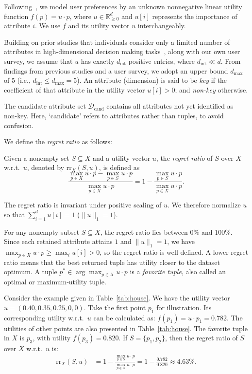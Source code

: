 Following~\cite{CB00, LC09, NL12, NS10, PW14}, we model user preferences by an unknown nonnegative linear utility function $f(p)=u\cdot p$, where $u\in\mathbb{R}_{\geq0}^{d}$ and $u[i]$ represents the importance of attribute $i$. We use $f$ and its utility vector $u$ interchangeably.

Building on prior studies that individuals consider only a limited number of attributes in high-dimensional decision making tasks~\cite{GG96, GA12, WX22, SC05, TK03, DMW12}, along with our own user survey, we assume that $u$ has exactly $d_\text{int}$ positive entries, where $d_\text{int}\ll d$. From findings from previous studies and a user survey, we adopt an upper bound $d_\text{max}$ of $5$ (i.e., $d_\text{int}\leq d_\text{max}=5$). An attribute (dimension) is said to be \textit{key} if the coefficient of that attribute in the utility vector $u[i]>0$; and \textit{non-key} otherwise.

The candidate attribute set $\mathcal{D}_\text{cand}$ contains all attributes not yet identified as non-key. Here, `candidate' refers to attributes rather than tuples, to avoid confusion.

We define the \textit{regret ratio}\cite{NS10} as follows:

\begin{definition}\cite{NS10}
Given a nonempty set $S \subseteq X$ and a utility vector $u$, the \emph{regret ratio} of $S$ over $X$ w.r.t.\ $u$, denoted by $\mathrm{rr}_X(S, u)$, is defined as
\[
\frac{\max_{p \in X} u \cdot p - \max_{p \in S} u \cdot p}{\max_{p \in X} u \cdot p}
= 1 - \frac{\max_{p \in S} u \cdot p}{\max_{p \in X} u \cdot p}.
\]
\end{definition}

The regret ratio is invariant under positive scaling of $u$. We therefore normalize $u$ so that $\sum_{i=1}^{d}u[i]=1$ ($\lVert u\rVert_1=1$).

For any nonempty subset $S\subseteq X$, the regret ratio lies between $0\%$ and $100\%$. Since each retained attribute attains $1$ and $\lVert u\rVert_1=1$, we have $\max_{p\in X}u\cdot p\geq\max_i u[i]>0$, so the regret ratio is well defined. A lower regret ratio means that the best returned tuple has utility closer to the dataset optimum. A tuple $p^*\in\arg\max_{p\in X}u\cdot p$ is a \textit{favorite tuple}, also called an optimal or maximum-utility tuple.

Consider the example given in Table~\ref{tab:house}. We have the utility vector $u = (0.40, 0.35, 0.25, 0, 0)$. Take the first point $p_1$ for illustration. Its corresponding utility w.r.t.\ $u$ can be calculated as: $f(p_1) = u \cdot p_1 = 0.782$. The utilities of other points are also presented in Table~\ref{tab:house}. The favorite tuple in $X$ is $p_3$, with utility $f(p_3) = 0.820$. If $S = \{p_1, p_2\}$, then the regret ratio of $S$ over $X$ w.r.t.\ $u$ is:
\[
\begin{aligned}
\mathrm{rr}_X(S, u) &= 1 - \frac{\max_{p \in S} u \cdot p}{\max_{p \in X} u \cdot p} = 1-\frac{0.782}{0.820} \approx 4.63\%.
\end{aligned}
\]

